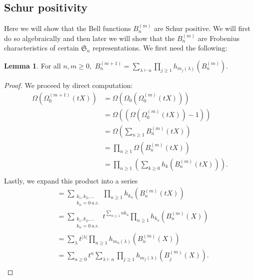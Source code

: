 \documentclass[12pt,reqno]{amsart}
\theoremstyle{definition}
\newtheorem{lem}[thm]{Lemma}
\begin{document}
\subsection{Schur positivity}

Here we will show that the Bell functions $B_n^{(m)}$ are Schur positive. We will first do so algebraically and then later we will show that the $B_n^{(m)}$ are Frobenius characteristics of certain $\mathfrak{S}_n$ representations. We first need the following:

\begin{lem}\label{recurrence lemma}
    For all $n,m \geq 0,$ 
    $B_n^{(m+1)} = \sum_{\lambda \vdash n} \prod_{j \geq 1} h_{m_j(\lambda)}(B_{n}^{(m)}).$
\end{lem}
\begin{proof}
We proceed by direct computation:
\begin{align*}
    \Omega\left( \Omega^{(m+1)}_0(tX) \right) &= \Omega(\Omega_0(\Omega_0^{(m)}(tX)) )\\
    &= \Omega((\Omega(\Omega_0^{(m)}(tX))-1 ))\\
    &= \Omega \left(\sum_{n \geq 1} B_{n}^{(m)}(tX) \right)\\
    &= \prod_{n \geq 1} \Omega \left( B_n^{(m)}(tX) \right)\\
    &= \prod_{n \geq 1}\left( \sum_{k \geq 0}  h_k\left(B_n^{(m)}(tX) \right) \right).\\
\end{align*}
Lastly, we expand this product into a series
\begin{align*}
    &= \sum_{\substack{k_1,k_2,\ldots \\
    k_n = 0 ~a.e.}}  \prod_{n \geq 1} h_{k_n}\left( B_{n}^{(m)}(tX) \right) \\
    &= \sum_{\substack{k_1,k_2,\ldots \\
    k_n = 0 ~a.e.}} t^{\sum_{n \geq 1} nk_n}  \prod_{n \geq 1} h_{k_n}\left( B_{n}^{(m)}(X) \right) \\
    &= \sum_{\lambda} t^{|\lambda|} \prod_{n \geq 1} h_{m_n(\lambda)}\left(B_n^{(m)}(X) \right)\\
    &= \sum_{n \geq 0} t^n \sum_{\lambda \vdash n} \prod_{j \geq 1} h_{m_j(\lambda)}\left(B_{j}^{(m)}(X)\right).\\
\end{align*}



\end{proof}
\end{document}
